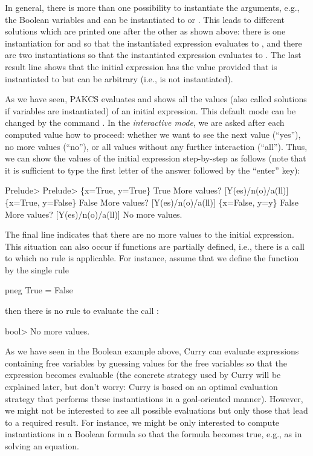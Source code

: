 In general, there is more than one possibility
to instantiate the arguments, e.g., the Boolean variables
 and  can be instantiated to  or .
This leads to different solutions which are printed
one after the other as shown above: there is one instantiation
for  and  so that the instantiated expression
evaluates to , and there are two instantiations
so that the instantiated expression evaluates to .
The last result line shows that the initial expression has the value
 provided that  is instantiated to 
but  can be arbitrary (i.e.,  is not instantiated).

As we have seen, PAKCS evaluates and shows all the values
(also called solutions if variables are instantiated)
of an initial expression. This default mode can be changed
by the command .
In the \emph{interactive mode}, we are asked after each
computed value how to proceed:
whether we want to see the next value (``yes''), no more values (``no''),
or all values without any further interaction (``all'').
Thus, we can show the values of the initial expression
step-by-step as follows (note that it is sufficient to type
the first letter of the answer followed by the ``enter'' key):
\begin{prog}
Prelude> 
Prelude> 
\{x=True, y=True\}  True
More values? [Y(es)/n(o)/a(ll)] 
\{x=True, y=False\} False
More values? [Y(es)/n(o)/a(ll)] 
\{x=False, y=y\} False
More values? [Y(es)/n(o)/a(ll)] 
No more values.
\end{prog}
The final line indicates that there are no more values to the
initial expression. This situation can also occur if functions
are partially defined, i.e., there is a call to which no rule
is applicable. For instance, assume that we define the function
 by the single rule
\begin{prog}
pneg True = False
\end{prog}
then there is no rule to evaluate the call :
\begin{prog}
bool> 
No more values.
\end{prog}
As we have seen in the Boolean example above,
Curry can evaluate expressions containing free variables
by guessing values for the free variables so that the expression
becomes evaluable (the concrete strategy used by Curry will be
explained later, but don't worry: Curry is based on an optimal
evaluation strategy \cite{AntoyEchahedHanus00JACM} that performs
these instantiations in a goal-oriented manner).
However, we might not be interested to see
all possible evaluations but only those that lead to a required
result. For instance, we might be only interested to compute
instantiations in a Boolean formula so that the formula becomes true,
e.g., as in solving an equation.

